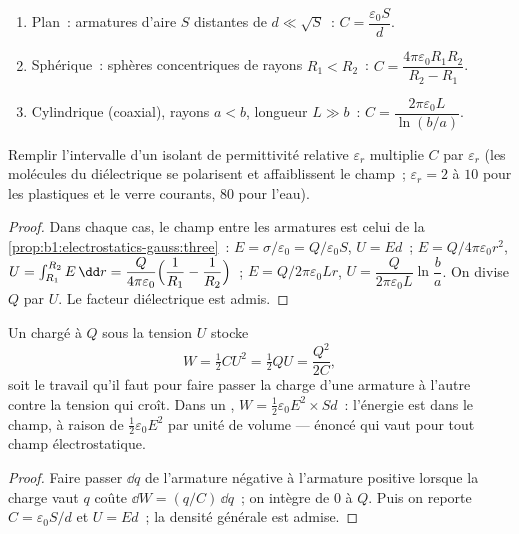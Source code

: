 \begin{proposition}\label{prop:b1:potential-capacitors:three}
\begin{enumerate}
  \item Plan~: armatures d'aire $S$ distantes de $d \ll \sqrt S$~:
        $C = \dfrac{\varepsilon_0S}{d}$.
  \item Sphérique~: sphères concentriques de rayons $R_1 < R_2$~:
        $C = \dfrac{4\pi\varepsilon_0R_1R_2}{R_2 - R_1}$.
  \item Cylindrique (coaxial), rayons $a < b$, longueur $L \gg b$~:
        $C = \dfrac{2\pi\varepsilon_0L}{\ln(b/a)}$.
\end{enumerate}
Remplir l'intervalle d'un isolant de permittivité relative $\varepsilon_r$
multiplie $C$ par $\varepsilon_r$ (les molécules du diélectrique se polarisent
et affaiblissent le champ~; $\varepsilon_r = 2$ à $10$ pour les plastiques et
le verre courants, $80$ pour l'eau).
\end{proposition}

\begin{proof}
Dans chaque cas, le champ entre les armatures est celui de la
\cref{prop:b1:electrostatics-gauss:three}~: $E = \sigma/\varepsilon_0 = Q/\varepsilon_0S$,
$U = Ed$~; $E = Q/4\pi\varepsilon_0r^2$, $U = \int_{R_1}^{R_2}E\,\dd r = \dfrac{Q}{4\pi\varepsilon_0}
\Bigl(\dfrac1{R_1} - \dfrac1{R_2}\Bigr)$~; $E = Q/2\pi\varepsilon_0Lr$, $U =
\dfrac{Q}{2\pi\varepsilon_0L}\ln\dfrac ba$. On divise $Q$ par $U$. Le facteur
diélectrique est admis.
\end{proof}

\begin{theorem}\label{thm:b1:potential-capacitors:energy}
Un  chargé à $Q$ sous la tension $U$ stocke
\[
W = \tfrac12 CU^2 = \tfrac12 QU = \frac{Q^2}{2C} ,
\]
soit le travail qu'il faut pour faire passer la charge d'une armature à
l'autre contre la tension qui croît. Dans un , $W = \tfrac12\varepsilon_0E^2
\times Sd$~: l'énergie est dans le champ, à raison de $\tfrac12\varepsilon_0E^2$
par unité de volume --- énoncé qui vaut pour tout champ électrostatique.
\end{theorem}

\begin{proof}
Faire passer $\dd q$ de l'armature négative à l'armature positive lorsque la
charge vaut $q$ coûte $\dd W = (q/C)\,\dd q$~; on intègre de $0$ à $Q$. Puis on
reporte $C = \varepsilon_0S/d$ et $U = Ed$~; la densité générale est admise.
\end{proof}

